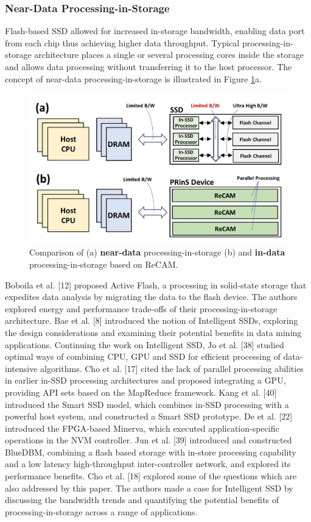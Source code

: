 \documentclass{superfri}
\begin{document}
\subsubsection{Near-Data Processing-in-Storage}
\label{sec:NDP_PRinS}
Flash-based SSD allowed for increased in-storage bandwidth, enabling data port from each chip thus achieving higher data throughput. Typical processing-in-storage architecture places a single or several processing cores inside the storage and allows data processing without transferring it to the host processor. The concept of near-data processing-in-storage is illustrated in Figure \ref{fig:in_vs_near_data}a. 

\begin{figure}[h!]
	\centerline{\includegraphics{Figures/In_vs_near_data.jpg}}
	\caption{Comparison of (a) \textbf{near-data} processing-in-storage (b) and \textbf{in-data} processing-in-storage based on ReCAM.}
	\label{fig:in_vs_near_data}
\end{figure}


Boboila et al. [12] proposed Active Flash, a processing in solid-state storage that expedites data analysis by migrating the data to the flash device. The authors explored energy and performance trade-offs of their processing-in-storage architecture. Bae et al. [8] introduced the notion of Intelligent SSDs, exploring the design considerations and examining their potential benefits in data mining applications. Continuing the work on Intelligent SSD, Jo et al. [38] studied optimal ways of combining CPU, GPU and SSD for efficient processing of data-intensive algorithms. Cho et al. [17] cited the lack of parallel processing abilities in earlier in-SSD processing architectures and proposed integrating a GPU, providing API sets based on the MapReduce framework. Kang et al. [40] introduced the Smart SSD model, which combines in-SSD processing with a powerful host system, and constructed a Smart SSD prototype. De et al. [22] introduced the FPGA-based Minerva, which executed application-specific operations in the NVM controller. Jun et al. [39] introduced and constructed BlueDBM, combining a flash based storage with in-store processing capability and a low latency high-throughput inter-controller network, and explored its performance benefits. Cho et al. [18] explored some of the questions which are also addressed by this paper. The authors made a case for Intelligent SSD by discussing the bandwidth trends and quantifying the potential benefits of processing-in-storage across a range of applications.
\end{document}
